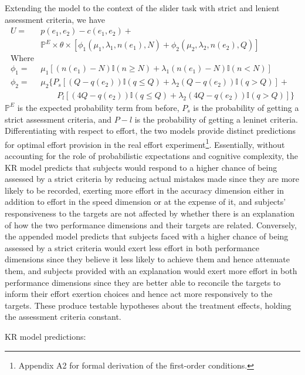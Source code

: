 \documentclass[
  12,
  letterpaper,
  DIV=11,
  numbers=noendperiod]{scrartcl}
\begin{document}
Extending the model to the context of the slider task with strict and
lenient assessment criteria, we have \[
\begin{aligned}
U = & p(e_1, e_2) - c(e_1, e_2) + \nonumber \\
    & \mathbb{P}^E \times \theta \times [\phi_1(\mu_1, \lambda_1, n(e_1), N) + \phi_2(\mu_2, \lambda_2, n(e_2), Q)] \nonumber \\
\text{Where}
\\
\phi_1 = & \mu_1[(n(e_1)-N)\mathbb{I}(n \geq N) + \lambda_1(n(e_1)-N)\mathbb{I}(n<N)] \nonumber \\
\phi_2 = & \mu_2 \{P_s[(Q-q(e_2))\mathbb{I}(q \leq Q) + \lambda_2(Q-q(e_2))\mathbb{I}(q>Q)] + \nonumber \\
& \qquad P_l[(4Q-q(e_2))\mathbb{I}(q \leq Q) + \lambda_2(4Q-q(e_2))\mathbb{I}(q>Q)]\} 
\end{aligned}
\] \(\mathbb{P}^E\) is the expected probability term from before,
\(P_s\) is the probability of getting a strict assessment criteria, and
\(P-l\) is the probability of getting a leninet criteria.
Differentiating with respect to effort, the two models provide distinct
predictions for optimal effort provision in the real effort
experiment\footnote{Appendix A2 for formal derivation of the first-order
  conditions.}. Essentially, without accounting for the role of
probabilistic expectations and cognitive complexity, the KR model
predicts that subjects would respond to a higher chance of being
assessed by a strict criteria by reducing actual mistakes made since
they are more likely to be recorded, exerting more effort in the
accuracy dimension either in addition to effort in the speed dimension
or at the expense of it, and subjects' responsiveness to the targets are
not affected by whether there is an explanation of how the two
performance dimensions and their targets are related. Conversely, the
appended model predicts that subjects faced with a higher chance of
being assessed by a strict criteria would exert less effort in both
performance dimensions since they believe it less likely to achieve them
and hence attenuate them, and subjects provided with an explanation
would exert more effort in both performance dimensions since they are
better able to reconcile the targets to inform their effort exertion
choices and hence act more responsively to the targets. These produce
testable hypotheses about the treatment effects, holding the assessment
criteria constant.

\noindent KR model predictions:
\end{document}
